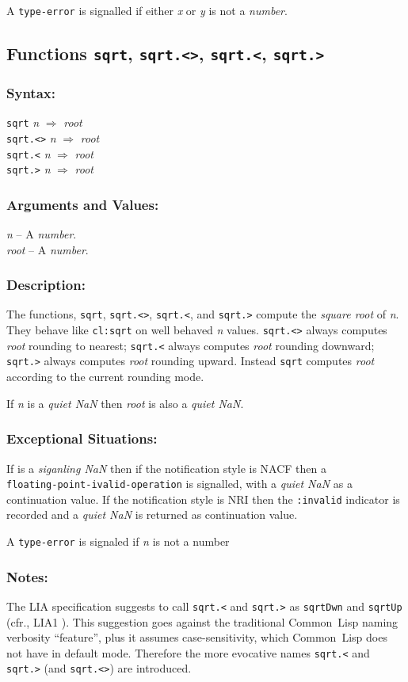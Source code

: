 \documentclass[10pt,fleqn]{article}
\newcommand{\CL}{\textsf{Common~Lisp}}
\newcommand{\code}[1]{\texttt{#1}}
\newcommand{\clliaterm}[1]{\textit{#1}}
\newcommand{\varname}[1]{\textit{#1}}
\newcommand{\clterm}[1]{\textit{#1}}
\newcommand{\RArrow}{$\Rightarrow$}
\newcommand{\DDictionaryItem}[1]{\vspace*{6pt}\noindent\hrulefill\vspace*{-9pt}\subsection*{#1}}
\newcommand{\DSyntax}{\subsubsection*{Syntax:}}
\newcommand{\DArgsNValues}{\subsubsection*{Arguments and Values:}}
\newcommand{\DDescription}{\subsubsection*{Description:}}
\newcommand{\DExceptional}{\subsubsection*{Exceptional Situations:}}
\newcommand{\DNotes}{\subsubsection*{Notes:}}
\begin{document}
A \code{type-error} is signalled if either \varname{x} or \varname{y} is
not a \clliaterm{number}.


\DDictionaryItem{Functions \code{sqrt}, \code{sqrt.<>}, \code{sqrt.<},
  \code{sqrt.>}}
\index{S!\code{sqrt}}
\index{S!\code{sqrt.<>}}
\index{S!\code{sqrt.<}}
\index{S!\code{sqrt.>}}


\DSyntax{}

\code{sqrt} \varname{n} \RArrow{} \varname{root}\\
\code{sqrt.<>} \varname{n} \RArrow{} \varname{root}\\
\code{sqrt.<} \varname{n} \RArrow{} \varname{root}\\
\code{sqrt.>} \varname{n} \RArrow{} \varname{root}

\DArgsNValues{}

\varname{n} -- A \clterm{number}.\\
\varname{root} -- A \clterm{number}.

\DDescription{}

The functions, \code{sqrt}, \code{sqrt.<>}, \code{sqrt.<}, and
\code{sqrt.>} compute the \emph{square root} of \varname{n}.  They
behave like \code{cl:sqrt} on well behaved \varname{n} values.
\code{sqrt.<>} always computes \varname{root} rounding to nearest;
\code{sqrt.<} always computes \varname{root} rounding downward;
\code{sqrt.>} always computes \varname{root} rounding upward. Instead
\code{sqrt} computes \varname{root} according to the current rounding
mode.

If \varname{n} is a \clliaterm{quiet NaN} then \varname{root} is also
a \clliaterm{quiet NaN}.


\DExceptional{}

If \varname{} is a \clliaterm{siganling NaN} then if the notification
style is NACF then a\\
\code{floating-point-ivalid-operation} is
signalled, with a \clliaterm{quiet NaN} as a continuation value.  If
the notification style is NRI then the \code{:invalid} indicator is
recorded and a \clliaterm{quiet NaN} is returned as continuation
value.


A \code{type-error} is signaled if \varname{n} is not a number

\DNotes{}

The LIA specification suggests to call \code{sqrt.<} and \code{sqrt.>}
as \code{sqrtDwn} and \code{sqrtUp} (cfr., LIA1
\cite{2012:LIA1}). This suggestion goes against the traditional \CL{}
naming verbosity ``feature'', plus it assumes case-sensitivity, which
\CL{} does not have in default mode.  Therefore the more evocative
names \code{sqrt.<} and \code{sqrt.>} (and \code{sqrt.<>}) are
introduced.
\end{document}
